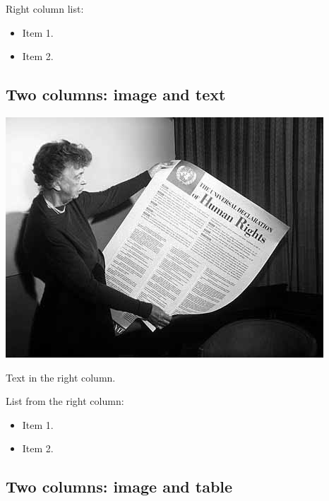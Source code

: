 \documentclass[
]{beamer}
\providecommand{\tightlist}{%
  \setlength{\itemsep}{0pt}\setlength{\parskip}{0pt}}
\begin{document}
Right column list:

\begin{itemize}
\tightlist
\item
  Item 1.
\item
  Item 2.
\end{itemize}

\hypertarget{two-columns-image-and-text}{%
\subsection{Two columns: image and
text}\label{two-columns-image-and-text}}

\includegraphics[width=\textwidth,height=0.5\textheight]{images/Eleanor_Roosevelt_and_Human_Rights_Declaration.jpeg}

Text in the right column.

List from the right column:

\begin{itemize}
\tightlist
\item
  Item 1.
\item
  Item 2.
\end{itemize}

\hypertarget{two-columns-image-and-table}{%
\subsection{Two columns: image and
table}\label{two-columns-image-and-table}}
\end{document}
